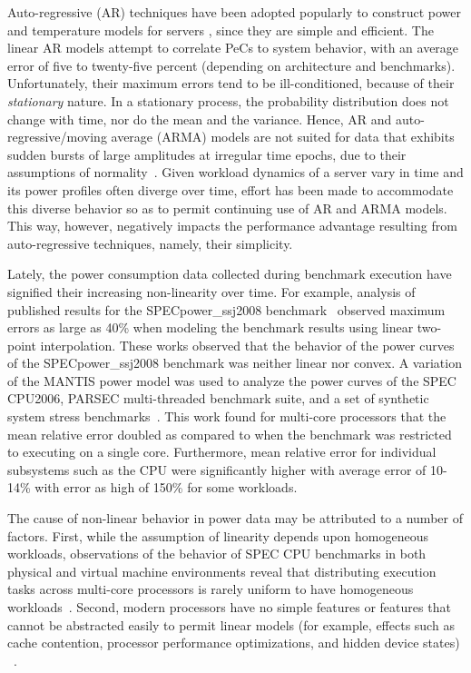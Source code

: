\documentclass[acmtaco]{acmtrans2m}
\begin{document}
Auto-regressive (AR) techniques have been adopted popularly to construct
power and temperature models for servers
\cite{Coskun2008,Powell2009,Bircher2011}, since they are simple and
efficient.  The linear AR models attempt to correlate PeCs to system
behavior, with an average error of five to twenty-five percent
(depending on architecture and benchmarks).  Unfortunately, their
maximum errors tend to be ill-conditioned, because of their
\textit{stationary} nature.  In a stationary process, the probability
distribution does not change with time, nor do the mean and the
variance.  Hence, AR and auto-regressive/moving average (ARMA) models
are not suited for data that exhibits sudden bursts of large amplitudes
at irregular time epochs, due to their assumptions of
normality~\cite{Tong1993}.  Given workload dynamics of a server vary in
time and its power profiles often diverge over time, effort has been
made to accommodate this diverse behavior
\cite{MesaMartinez2007,Coskun2008} so as to permit continuing use of AR
and ARMA models.  This way, however, negatively impacts the performance
advantage resulting from auto-regressive techniques, namely, their
simplicity.

Lately, the power consumption data collected during benchmark execution
have signified their increasing non-linearity over time. For example,
analysis of published results for the SPECpower\_ssj2008
benchmark~\cite{Varsampoulos2010,Hsu2011} observed maximum errors as
large as 40\% when modeling the benchmark results using linear two-point
interpolation. These works observed that the behavior of the power
curves of the SPECpower\_ssj2008 benchmark was neither linear nor
convex.  A variation of the MANTIS power model \cite{Economou2006} was
used to analyze the power curves of the SPEC CPU2006, PARSEC
multi-threaded benchmark suite\cite{Bienia2011}, and a set of synthetic
system stress benchmarks~\cite{McCullough2011}.  This work found for
multi-core processors that the mean relative error doubled as compared
to when the benchmark was restricted to executing on a single core.
Furthermore, mean relative error for individual subsystems such as the
CPU were significantly higher with average error of 10-14\% with error
as high of 150\% for some workloads.

The cause of non-linear behavior in power data may be attributed to a
number of factors.  First, while the assumption of linearity depends
upon homogeneous workloads, observations of the behavior of SPEC CPU
benchmarks in both physical and virtual machine environments reveal that
distributing execution tasks across multi-core processors is rarely
uniform to have homogeneous workloads~\cite{Kansal2010}.  Second, modern
processors have no simple features or features that cannot be abstracted
easily to permit linear models (for example, effects such as cache
contention, processor performance optimizations, and hidden device
states) ~\cite{McCullough2011}.
\end{document}
